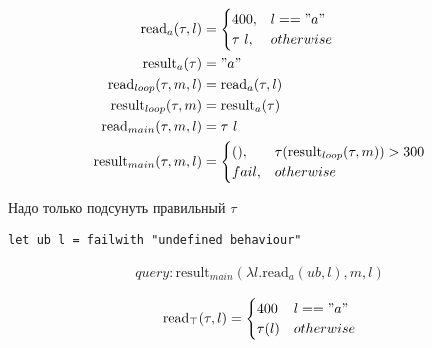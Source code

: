 \documentclass{article}
\renewcommand{\read}[1]{\text{read}_{#1}}
\newcommand{\result}[1]{\text{result}_{#1}}
\begin{document}
\begin{align}
\read{a}(\tau,l) &= \begin{cases} 400,& l=="a" \\ \tau\ l, & otherwise\end{cases}\\
\result{a}(\tau) &= "a" \nonumber \\
\read{loop}(\tau,m,l) &= \read{a}(\tau,l)\\
\result{loop}(\tau,m) &= \result{a}(\tau) \nonumber \\
\read{main}(\tau,m,l) &= \tau\ l\\
\result{main}(\tau,m,l) &= \begin{cases} (),& \tau(\result{loop}(\tau,m))>300  \\ fail, & otherwise\end{cases}
\end{align}

Надо только подсунуть правильный $\tau$
\begin{verbatim}
let ub l = failwith "undefined behaviour"
\end{verbatim}


\begin{align}
query: \result{main}(\lambda l.\read{a}(ub, l), m, l)
\end{align}

\begin{align}
\read{\top}(\tau,l) = \begin{cases} 400 & l == "a" \\ \tau(l)&otherwise\end{cases}  \nonumber
\end{align}
\end{document}
